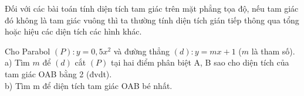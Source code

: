 \begin{nx}
	Đối với các bài toán tính diện tích tam giác trên mặt phẳng tọa độ, nếu tam giác đó không là tam giác vuông thì ta thường tính diện tích gián tiếp thông qua tổng hoặc hiệu các diện tích các hình khác.
\end{nx}
\begin{vd}
	Cho Parabol $( P )\colon y=0,5{{x}^{2}}$ và đường thẳng $(d)\colon y=mx+1$ ($m$ là tham số). \\
	a) Tìm $m$ để $\left( d \right)$ cắt $\left( P \right)$ tại hai điểm phân biệt A, B sao cho diện tích của tam giác OAB bằng 2 (đvdt).\\
	b) Tìm m để diện tích tam giác OAB bé nhất.
\end{vd}
